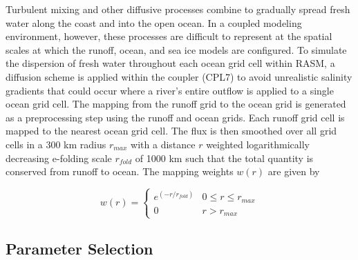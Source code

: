 \documentclass[jgrga, draft]{agutex}
\begin{document}
\begin{article}
Turbulent mixing and other diffusive processes combine to gradually spread fresh water along the coast and into the open ocean.
In a coupled modeling environment, however, these processes are difficult to represent at the spatial scales at which the runoff, ocean, and sea ice models are configured.
To simulate the dispersion of fresh water throughout each ocean grid cell within RASM, a diffusion scheme is applied within the coupler (CPL7) to avoid unrealistic salinity gradients that could occur where a river's entire outflow is applied to a single ocean grid cell.
The mapping from the runoff grid to the ocean grid is generated as a preprocessing step using the runoff and ocean grids.
Each runoff grid cell is mapped to the nearest ocean grid cell.
The flux is then smoothed over all grid cells in a 300 km radius $r_{max}$ with a distance $r$ weighted logarithmically decreasing e-folding scale $r_{fold}$ of 1000 km such that the total quantity is conserved from runoff to ocean.
The mapping weights $w(r)$ are given by

\begin{equation}
  \label{eq:diffusion}
  w(r)=
     \begin{cases}
        e^{(-r/r_{fold})} & 0\leq r\leq r_{max} \\
        0 & r > r_{max}
     \end{cases}
\end{equation}

\subsection{Parameter Selection}
\label{sec:parameters}


\end{article}
\end{document}
